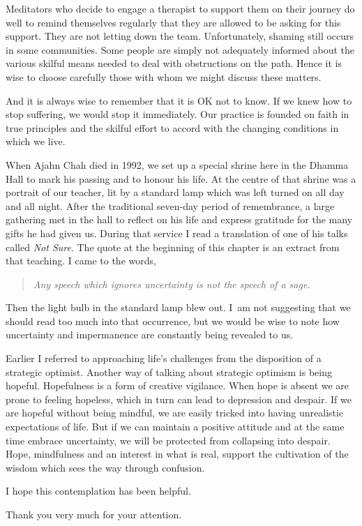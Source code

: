 Meditators who decide to engage a therapist to support them on their
journey do well to remind themselves regularly that they are allowed to
be asking for this support. They are not letting down the team.
Unfortunately, shaming still occurs in some communities. Some people are
simply not adequately informed about the various skilful means needed to
deal with obstructions on the path. Hence it is wise to choose carefully
those with whom we might discuss these matters.

And it is always wise to remember that it is OK not to know. If we knew
how to stop suffering, we would stop it immediately. Our practice is
founded on faith in true principles and the skilful effort to accord
with the changing conditions in which we live.

When Ajahn Chah died in 1992, we set up a special shrine here in the Dhamma Hall
to mark his passing and to honour his life. At the centre of that
shrine was a portrait of our teacher, lit by a standard lamp which was
left turned on all day and all night. After the traditional seven-day
period of remembrance, a large gathering met in the hall to reflect on
his life and express gratitude for the many gifts he had given us.
During that service I read a translation of one of his talks called
\emph{Not Sure}.\thinspace \cite{not-sure} The quote at the beginning of this chapter is
an extract from that teaching. I came to the words,

\begin{quote}
\itshape
Any speech which ignores uncertainty is not the speech of a sage.
\end{quote}

Then the light bulb in the standard lamp blew out. I~am not suggesting that we
should read too much into that occurrence, but we would be wise to note how
uncertainty and impermanence are constantly being revealed to us.

Earlier I referred to approaching life's challenges from the disposition
of a strategic optimist. Another way of talking about strategic optimism
is being hopeful. Hopefulness is a form of creative vigilance. When hope
is absent we are prone to feeling hopeless, which in turn can lead to
depression and despair. If we are hopeful without being mindful, we are
easily tricked into having unrealistic expectations of life. But if we
can maintain a positive attitude and at the same time embrace
uncertainty, we will be protected from collapsing into despair. Hope,
mindfulness and an interest in what is real, support the cultivation of
the wisdom which sees the way through confusion.

I hope this contemplation has been helpful.

Thank you very much for your attention.

